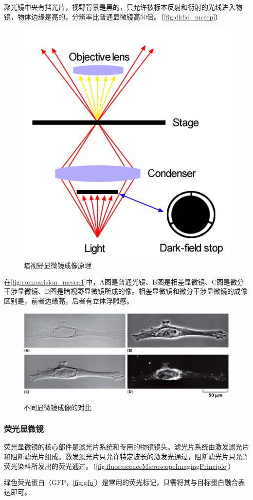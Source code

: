 聚光镜中央有挡光片，视野背景是黑的，只允许被标本反射和衍射的光线进入物镜，物体边缘是亮的。分辨率比普通显微镜高50倍。（\autoref{fig:dkfld_mcscp}）

\begin{figure}[htbp]
	\centering
	\includegraphics[width=0.4\linewidth]{Pics/暗视野显微镜}
	\caption{暗视野显微镜成像原理}
	\label{fig:dkfld_mcscp}
\end{figure}

在\autoref{fig:comparision_mcscp1}中，A图是普通光镜、B图是相差显微镜、C图是微分干涉显微镜、D图是暗视野显微镜所成的像。相差显微镜和微分干涉显微镜的成像区别是，前者边缘亮，后者有立体浮雕感。

\begin{figure}[htbp]
	\centering
	\includegraphics[width=0.8\linewidth]{Pics/显微镜成像对比}
	\caption{不同显微镜成像的对比}
	\label{fig:comparision_mcscp1}
\end{figure}

\subsubsection{荧光显微镜}

荧光显微镜的核心部件是滤光片系统和专用的物镜镜头。滤光片系统由激发滤光片和阻断滤光片组成。激发滤光片只允许特定波长的激发光通过，阻断滤光片只允许荧光染料所发出的荧光通过。（\autoref{fig:fluorescenceMicroscopeImagingPrinciple}）

绿色荧光蛋白（GFP，\autoref{fig:gfp}）是常用的荧光标记，只需将其与目标蛋白融合表达即可。

